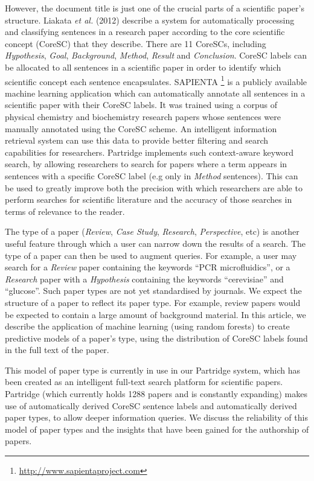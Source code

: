 \documentclass{svmult}
\begin{document}
However, the document title is just one of the crucial parts of a scientific
paper's structure.  Liakata \emph{et al.} (2012) describe a system for
automatically processing and classifying sentences in a research paper
according to the core scientific concept (CoreSC) that they
describe\cite{Liakata2012}.  There are 11 CoreSCs, including {\em Hypothesis},
{\em Goal}, {\it Background}, {\em Method}, {\em Result} and {\em Conclusion}.
CoreSC labels can be allocated to all sentences in a scientific paper in order
to identify which scientific concept each sentence encapsulates.  SAPIENTA
\footnote{\url{http://www.sapientaproject.com}} is a publicly available machine learning
application which can automatically annotate all sentences in a scientific
paper with their CoreSC labels. It was trained using a corpus of physical
chemistry and biochemistry research papers whose sentences were manually
annotated using the CoreSC\cite{LIAKATA10.644} scheme.  An intelligent 
information retrieval system can use this data to provide better filtering and
search capabilities for researchers.  Partridge implements such context-aware
keyword search, by allowing researchers to search for papers where a term
appears in sentences with a specific CoreSC label (e.g only in {\em Method}
sentences). This can be used to greatly improve both the precision with which
researchers are able to perform searches for scientific literature and the
accuracy of those searches in terms of relevance to the reader.

The type of a paper ({\em Review}, {\em Case Study}, {\em Research}, {\em
Perspective}, etc) is another useful feature through which a user can narrow
down the results of a search.  The type of a paper can then be used to augment
queries.  For example, a user may search for a {\em Review} paper containing
the keywords ``PCR microfluidics'', or a {\em Research} paper with a {\em
Hypothesis} containing the keywords ``cerevisiae'' and ``glucose''.   Such
paper types are not yet standardised by journals.  We expect the structure of a
paper to reflect its paper type.  For example, review papers would be expected
to contain a large amount of background material.  In this article, we describe
the application of machine learning (using random forests) to create predictive
models of a paper's type, using the distribution of CoreSC labels found in the
full text of the paper. 

This model of paper type is currently in use in our Partridge system, which has
been created as an intelligent full-text search platform for scientific papers.
Partridge (which currently holds 1288 papers and is constantly expanding) 
makes use of automatically derived CoreSC sentence labels and
automatically derived paper types, to allow deeper information queries.  We
discuss the reliability of this model of paper types and the insights that have
been gained for the authorship of papers.
\end{document}
